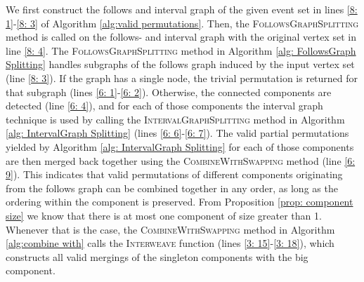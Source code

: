 We first construct the follows and interval graph of the given event set in lines \ref{8: 1}-\ref{8: 3} of Algorithm \ref{alg:valid permutations}.
Then, the \textsc{FollowsGraphSplitting} method is called on the follows- and interval graph with the original vertex set in line \ref{8: 4}.
The \textsc{FollowsGraphSplitting} method in Algorithm \ref{alg: FollowsGraph Splitting} handles subgraphs of the follows graph induced by the input vertex set (line \ref{8: 3}).
If the graph has a single node, the trivial permutation is returned for that subgraph (lines \ref{6: 1}-\ref{6: 2}).
Otherwise, the connected components are detected (line \ref{6: 4}), and for each of those components the interval graph technique is used by calling the \textsc{IntervalGraphSplitting} method in Algorithm  \ref{alg: IntervalGraph Splitting} (lines \ref{6: 6}-\ref{6: 7}).
The valid partial permutations yielded by Algorithm \ref{alg: IntervalGraph Splitting} for each of those components are then merged back together using the \textsc{CombineWithSwapping} method (line \ref{6: 9}).
This indicates that valid permutations of different components originating from the follows graph can be combined together in any order, as long as the ordering within the component is preserved.
From Proposition \ref{prop: component size} we know that there is at most one component of size greater than 1.
Whenever that is the case, the \textsc{CombineWithSwapping} method in Algorithm \ref{alg:combine with} calls the \textsc{Interweave} function (lines \ref{3: 15}-\ref{3: 18}), which constructs all valid mergings of the singleton components with the big component.

